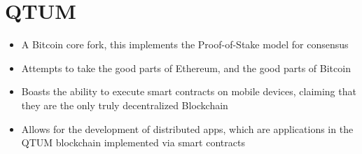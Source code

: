 \section{QTUM}
\begin{itemize}
	\item A Bitcoin core fork, this implements the Proof-of-Stake model for consensus
	\item Attempts to take the good parts of Ethereum, and the good parts of Bitcoin
	\item Boasts the ability to execute smart contracts on mobile devices, claiming that they are the only truly decentralized Blockchain
	\item Allows for the development of distributed apps, which are applications in the QTUM blockchain implemented via smart contracts
\end{itemize}